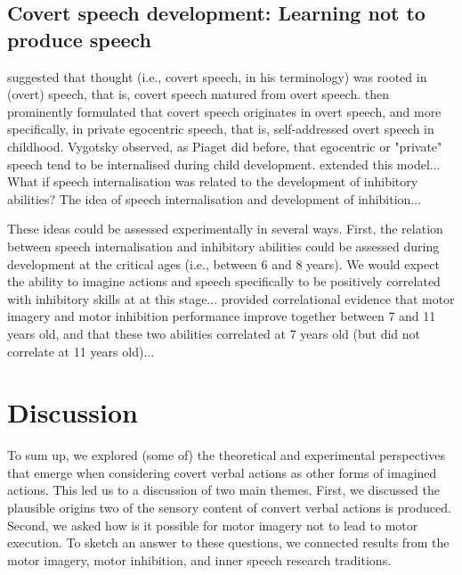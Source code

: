 \documentclass[utf8]{template/frontiersSCNS} %
\begin{document}
\subsection{Covert speech development: Learning not to produce speech}

\cite{watson_psychology_1919} suggested that thought (i.e., covert speech, in his terminology) was rooted in (overt) speech, that is, covert speech matured from overt speech. \cite{vygotsky_thought_1934} then prominently formulated that covert speech originates in overt speech, and more specifically, in private egocentric speech, that is, self-addressed overt speech in childhood. Vygotsky observed, as Piaget did before, that egocentric or "private" speech tend to be internalised during child development. \cite{fernyhough_alien_2004} extended this model... What if speech internalisation was related to the development of inhibitory abilities? The idea of speech internalisation and development of inhibition...

These ideas could be assessed experimentally in several ways. First, the relation between speech internalisation and inhibitory abilities could be assessed during development at the critical ages (i.e., between 6 and 8 years). We would expect the ability to imagine actions and speech specifically to be positively correlated with inhibitory skills at at this stage...  \cite{wang_relationship_2021} provided correlational evidence that motor imagery and motor inhibition performance improve together between 7 and 11 years old, and that these two abilities correlated at 7 years old (but did not correlate at 11 years old)...

\section{Discussion}


To sum up, we explored (some of) the theoretical and experimental perspectives that emerge when considering covert verbal actions as other forms of imagined actions. This led us to a discussion of two main themes. First, we discussed the plausible origins two of the sensory content of convert verbal actions is produced. Second, we asked how is it possible for motor imagery not to lead to motor execution. To sketch an answer to these questions, we connected results from the motor imagery, motor inhibition, and inner speech research traditions.
\end{document}
